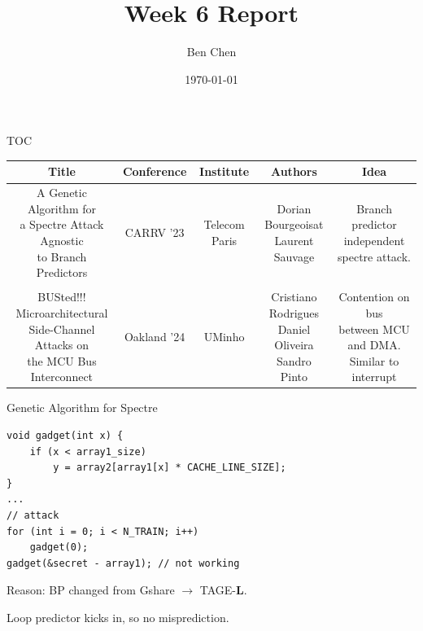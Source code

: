 \documentclass{beamer}
\title{Week 6 Report}
\author{Ben Chen}
\institute{Dept of Computer Science and Engineering, SUSTech}
\date{\today}
\begin{document}
\frame{\titlepage}

\begin{frame}{TOC}
\begin{table}[ht]
    \tiny
	\centering
	\begin{tabular}[c]{ccccc}
		\toprule
        Title & Conference & Institute & Authors & Idea \\
		\midrule
        \makecell{A Genetic Algorithm for \\ a Spectre Attack Agnostic \\ to Branch Predictors} & CARRV '23 & Telecom Paris & \makecell{Dorian Bourgeoisat \\ Laurent Sauvage}  & \makecell{Branch predictor independent \\ spectre attack.} \\ \\ 
        \makecell{BUSted!!! Microarchitectural \\ Side-Channel Attacks on \\ the MCU Bus Interconnect} & Oakland '24 & UMinho & \makecell{Cristiano Rodrigues \\ Daniel Oliveira \\ Sandro Pinto}  & \makecell{Contention on bus \\ between MCU and DMA. \\ Similar to interrupt} \\
		\bottomrule
	\end{tabular}
\end{table}
\end{frame}

\begin{frame}[fragile]{Genetic Algorithm for Spectre\cite{bourgeoisat-2023}}
\begin{lstlisting}
void gadget(int x) {
    if (x < array1_size)
        y = array2[array1[x] * CACHE_LINE_SIZE];
}
...
// attack
for (int i = 0; i < N_TRAIN; i++)
    gadget(0);
gadget(&secret - array1); // not working
\end{lstlisting}

Reason: BP changed from Gshare $\to$ TAGE-\textbf{L}.

Loop predictor kicks in, so no misprediction.
\end{frame}
\end{document}
